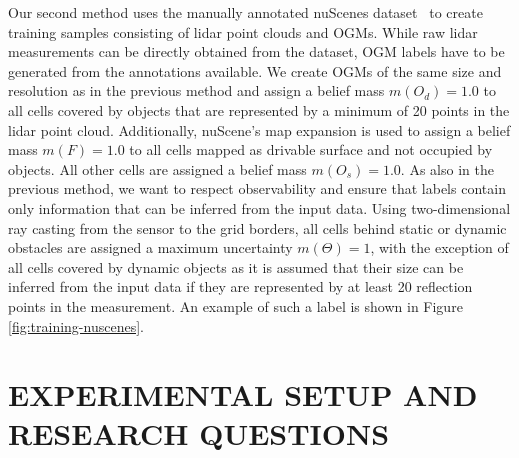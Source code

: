 \documentclass[conference]{IEEEtran}
\begin{document}
Our second method uses the manually annotated nuScenes dataset~\cite{Caesar.2020} to create training samples consisting of lidar point clouds and OGMs. While raw lidar measurements can be directly obtained from the dataset, OGM labels have to be generated from the annotations available. We create OGMs of the same size and resolution as in the previous method and assign a belief mass $m(O_d)=1.0$ to all cells covered by objects that are represented by a minimum of 20 points in the lidar point cloud. Additionally, nuScene's map expansion is used to assign a belief mass $m(F)=1.0$ to all cells mapped as drivable surface and not occupied by objects. All other cells are assigned a belief mass $m(O_s)=1.0$. As also in the previous method, we want to respect observability and ensure that labels contain only information that can be inferred from the input data. Using two-dimensional ray casting from the sensor to the grid borders, all cells behind static or dynamic obstacles are assigned a maximum uncertainty $m(\Theta)=1$, with the exception of all cells covered by dynamic objects as it is assumed that their size can be inferred from the input data if they are represented by at least 20 reflection points in the measurement. An example of such a label is shown in Figure \ref{fig:training-nuscenes}.


\section{EXPERIMENTAL SETUP AND RESEARCH QUESTIONS}
\end{document}

